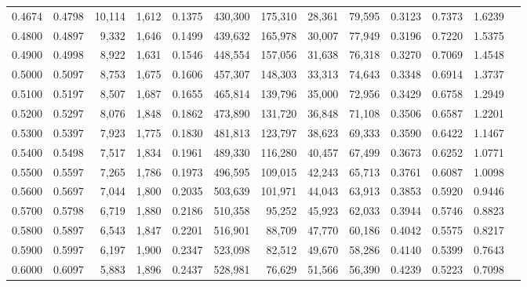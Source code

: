 \begin{tabular}{rrrrrrrrrrrrr}
0.4674 & 0.4798 & 10,114 & 1,612 &                                     0.1375 & 430,300 & 175,310 &  28,361 &  79,595 & 0.3123 & 0.7373 & 1.6239 \\
0.4800 & 0.4897 &  9,332 & 1,646 &                                     0.1499 & 439,632 & 165,978 &  30,007 &  77,949 & 0.3196 & 0.7220 & 1.5375 \\
0.4900 & 0.4998 &  8,922 & 1,631 &                                     0.1546 & 448,554 & 157,056 &  31,638 &  76,318 & 0.3270 & 0.7069 & 1.4548 \\
0.5000 & 0.5097 &  8,753 & 1,675 &                                     0.1606 & 457,307 & 148,303 &  33,313 &  74,643 & 0.3348 & 0.6914 & 1.3737 \\
0.5100 & 0.5197 &  8,507 & 1,687 &                                     0.1655 & 465,814 & 139,796 &  35,000 &  72,956 & 0.3429 & 0.6758 & 1.2949 \\
0.5200 & 0.5297 &  8,076 & 1,848 &                                     0.1862 & 473,890 & 131,720 &  36,848 &  71,108 & 0.3506 & 0.6587 & 1.2201 \\
0.5300 & 0.5397 &  7,923 & 1,775 &                                     0.1830 & 481,813 & 123,797 &  38,623 &  69,333 & 0.3590 & 0.6422 & 1.1467 \\
0.5400 & 0.5498 &  7,517 & 1,834 &                                     0.1961 & 489,330 & 116,280 &  40,457 &  67,499 & 0.3673 & 0.6252 & 1.0771 \\
0.5500 & 0.5597 &  7,265 & 1,786 &                                     0.1973 & 496,595 & 109,015 &  42,243 &  65,713 & 0.3761 & 0.6087 & 1.0098 \\
0.5600 & 0.5697 &  7,044 & 1,800 &                                     0.2035 & 503,639 & 101,971 &  44,043 &  63,913 & 0.3853 & 0.5920 & 0.9446 \\
0.5700 & 0.5798 &  6,719 & 1,880 &                                     0.2186 & 510,358 &  95,252 &  45,923 &  62,033 & 0.3944 & 0.5746 & 0.8823 \\
0.5800 & 0.5897 &  6,543 & 1,847 &                                     0.2201 & 516,901 &  88,709 &  47,770 &  60,186 & 0.4042 & 0.5575 & 0.8217 \\
0.5900 & 0.5997 &  6,197 & 1,900 &                                     0.2347 & 523,098 &  82,512 &  49,670 &  58,286 & 0.4140 & 0.5399 & 0.7643 \\
0.6000 & 0.6097 &  5,883 & 1,896 &                                     0.2437 & 528,981 &  76,629 &  51,566 &  56,390 & 0.4239 & 0.5223 & 0.7098 \\

\end{tabular}
